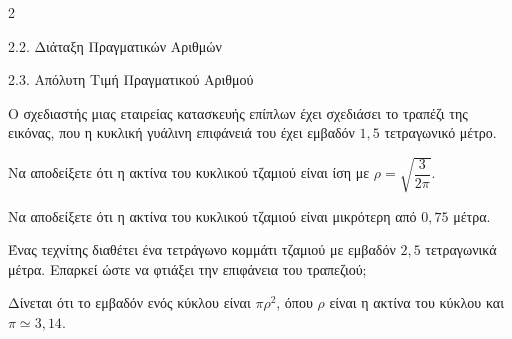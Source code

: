 \begin{ylh}{2}
    \item 2.2. Διάταξη Πραγματικών Αριθμών
    \item 2.3. Απόλυτη Τιμή Πραγματικού Αριθμού
\end{ylh}
{
Ο σχεδιαστής μιας εταιρείας κατασκευής επίπλων έχει σχεδιάσει το τραπέζι της εικόνας, που η κυκλική γυάλινη επιφάνειά του έχει εμβαδόν $1{,}5$ τετραγωνικό μέτρο.
\begin{alist}
\item Να αποδείξετε ότι η ακτίνα του κυκλικού τζαμιού είναι ίση με $\rho = \sqrt{\dfrac{3}{2\pi}}$.
\item Να αποδείξετε ότι η ακτίνα του κυκλικού τζαμιού είναι μικρότερη από $0{,}75$ μέτρα.
\item Ένας τεχνίτης διαθέτει ένα τετράγωνο κομμάτι τζαμιού με εμβαδόν $2{,}5$ τετραγωνικά μέτρα. Επαρκεί ώστε να φτιάξει την επιφάνεια του τραπεζιού;

Δίνεται ότι το εμβαδόν ενός κύκλου είναι $\pi\rho^{2}$, όπου $\rho$ είναι η ακτίνα του κύκλου και $\pi \simeq 3{,}14$.
\end{alist}}

